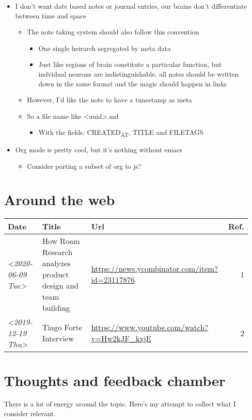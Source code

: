 \documentclass[11pt]{article}
\begin{document}
\begin{itemize}
\item I don't want date based notes or journal entries, our brains don't differentiate between time and space
\begin{itemize}
\item The note taking system should also follow this convention
\begin{itemize}
\item One single heirarch segregated by meta data
\item Just like regions of brain constitute a particular function, but indvidual neurons are indistinguishable, all notes should be written down in the same format and the magic should happen in links
\end{itemize}
\item However, I'd like the note to have a timestamp as meta
\item So a file name like <uuid>.md
\begin{itemize}
\item With the fields: CREATED\textsubscript{AT}, TITLE and FILETAGS
\end{itemize}
\end{itemize}
\item Org mode is pretty cool, but it's nothing without emacs
\begin{itemize}
\item Consider porting a subset of org to js?
\end{itemize}
\end{itemize}

\section{Around the web}
\label{sec:orgd005f71}
\begin{center}
\begin{tabular}{lllr}
\hline
Date & Title & Url & Ref.\\
\hline
\textit{<2020-06-09 Tue>} & How Roam Research analyzes product design and team building & \url{https://news.ycombinator.com/item?id=23117876} & 1\\
\textit{<2019-12-19 Thu>} & Tiago Forte Interview & \url{https://www.youtube.com/watch?v=Hw2kJF\_kxjE} & 2\\
\hline
\end{tabular}
\end{center}

\section{Thoughts and feedback chamber}
\label{sec:orge0d9b64}
There is a lot of energy around the topic. Here's my attempt to collect what I consider relevant.
\end{document}
